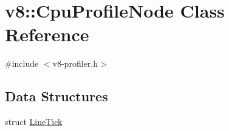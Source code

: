 \hypertarget{classv8_1_1CpuProfileNode}{}\section{v8\+:\+:Cpu\+Profile\+Node Class Reference}
\label{classv8_1_1CpuProfileNode}


{\ttfamily \#include $<$v8-\/profiler.\+h$>$}

\subsection*{Data Structures}
\begin{DoxyCompactItemize}
\item 
struct \mbox{\hyperlink{structv8_1_1CpuProfileNode_1_1LineTick}{Line\+Tick}}
\end{DoxyCompactItemize}

